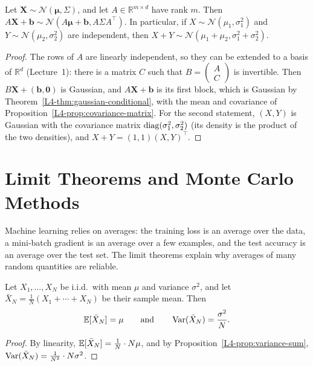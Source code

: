 \begin{corollary}\label{L4-cor:gaussian-linear}
    Let $\mathbf{X} \sim \mathcal{N}(\boldsymbol{\mu}, \Sigma)$, and let $A \in \mathbb{R}^{m \times d}$ have rank $m$. Then $A\mathbf{X} + \mathbf{b} \sim \mathcal{N}(A\boldsymbol{\mu} + \mathbf{b}, A\Sigma A^\top)$. In particular, if $X \sim \mathcal{N}(\mu_1, \sigma_1^2)$ and $Y \sim \mathcal{N}(\mu_2, \sigma_2^2)$ are independent, then $X + Y \sim \mathcal{N}(\mu_1 + \mu_2, \sigma_1^2 + \sigma_2^2)$.
\end{corollary}

\begin{proof}
    The rows of $A$ are linearly independent, so they can be extended to a basis of $\mathbb{R}^d$ (Lecture~1): there is a matrix $C$ such that $B = \left(\begin{smallmatrix} A \\ C \end{smallmatrix}\right)$ is invertible. Then $B\mathbf{X} + (\mathbf{b}, \mathbf{0})$ is Gaussian, and $A\mathbf{X} + \mathbf{b}$ is its first block, which is Gaussian by Theorem~\ref{L4-thm:gaussian-conditional}, with the mean and covariance of Proposition~\ref{L4-prop:covariance-matrix}. For the second statement, $(X, Y)$ is Gaussian with the covariance matrix $\operatorname{diag}(\sigma_1^2, \sigma_2^2)$ (its density is the product of the two densities), and $X + Y = (1, 1)(X, Y)^\top$.
\end{proof}

\section{Limit Theorems and Monte Carlo Methods}\label{L4-sec:limits}

Machine learning relies on averages: the training loss is an average over the data, a mini-batch gradient is an average over a few examples, and the test accuracy is an average over the test set. The limit theorems explain why averages of many random quantities are reliable.

\begin{proposition}\label{L4-prop:sample-mean}
    Let $X_1, \ldots, X_N$ be i.i.d.\ with mean $\mu$ and variance $\sigma^2$, and let $\bar X_N = \frac{1}{N}(X_1 + \cdots + X_N)$ be their sample mean. Then
    \[\mathbb{E}[\bar X_N] = \mu \qquad \text{and} \qquad \operatorname{Var}(\bar X_N) = \frac{\sigma^2}{N}.\]
\end{proposition}

\begin{proof}
    By linearity, $\mathbb{E}[\bar X_N] = \frac{1}{N} \cdot N\mu$, and by Proposition~\ref{L4-prop:variance-sum}, $\operatorname{Var}(\bar X_N) = \frac{1}{N^2} \cdot N\sigma^2$.
\end{proof}

